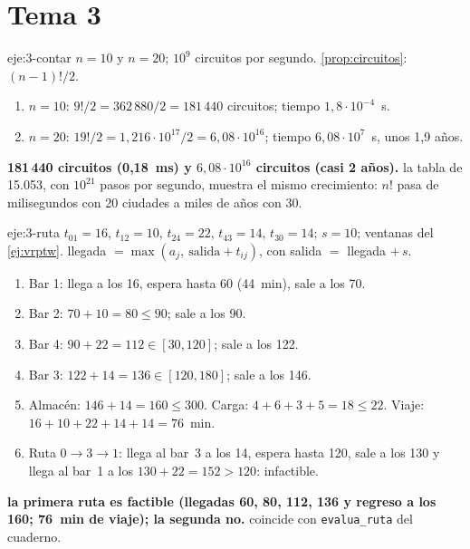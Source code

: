 \section{Tema 3}

\begin{solucion}{eje:3-contar}
\datos $n=10$ y $n=20$; $10^{9}$ circuitos por segundo.
\planteamiento \cref{prop:circuitos}: $(n-1)!/2$.
\pasos
\begin{enumerate}[label=\arabic*.]
  \item $n=10$: $9!/2=362\,880/2=181\,440$ circuitos; tiempo $1{,}8\cdot 10^{-4}$~s.
  \item $n=20$: $19!/2=1{,}216\cdot 10^{17}/2=6{,}08\cdot 10^{16}$; tiempo $6{,}08\cdot 10^{7}$~s, unos 1{,}9 años.
\end{enumerate}
\resultado \textbf{181\,440 circuitos (0,18~ms) y $6{,}08\cdot 10^{16}$ circuitos (casi 2 años).}
\comprobacion la tabla de 15.053, con $10^{21}$ pasos por segundo, muestra el mismo crecimiento: $n!$ pasa de milisegundos con 20 ciudades a miles de años con 30.
\end{solucion}

\begin{solucion}{eje:3-ruta}
\datos $t_{01}=16$, $t_{12}=10$, $t_{24}=22$, $t_{43}=14$, $t_{30}=14$; $s=10$; ventanas del \cref{ej:vrptw}.
\planteamiento llegada $=\max(a_j,\ \text{salida}+t_{ij})$, con salida $=$ llegada $+\,s$.
\pasos
\begin{enumerate}[label=\arabic*.]
  \item Bar 1: llega a los 16, espera hasta 60 (44~min), sale a los 70.
  \item Bar 2: $70+10=80\le 90$; sale a los 90.
  \item Bar 4: $90+22=112\in[30,120]$; sale a los 122.
  \item Bar 3: $122+14=136\in[120,180]$; sale a los 146.
  \item Almacén: $146+14=160\le 300$. Carga: $4+6+3+5=18\le 22$. Viaje: $16+10+22+14+14=76$~min.
  \item Ruta $0\to 3\to 1$: llega al bar~3 a los 14, espera hasta 120, sale a los 130 y llega al bar~1 a los $130+22=152>120$: infactible.
\end{enumerate}
\resultado \textbf{la primera ruta es factible (llegadas 60, 80, 112, 136 y regreso a los 160; 76~min de viaje); la segunda no.}
\comprobacion coincide con \texttt{evalua\_ruta} del cuaderno.
\end{solucion}


